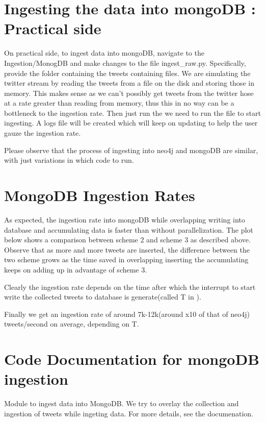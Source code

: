 \documentclass[letterpaper,10pt,english]{sphinxmanual}
\begin{document}
\section{Ingesting the data into mongoDB : Practical side}
\label{\detokenize{mongoDB_data_ingestion:ingesting-the-data-into-mongodb-practical-side}}
On practical side, to ingest data into mongoDB, navigate to the Ingestion/MonogDB and make changes to the file ingest\_raw.py. Specifically, provide the folder containing the tweets containing files. We are simulating the twitter stream by reading the tweets from a file on the disk and storing those in memory. This makes sense as we can’t possibly get tweets from the twitter hose at a rate greater than reading from memory, thus this in no way can be a bottleneck to the ingestion rate. Then just run the we need to run the file  to start ingesting. A logs file will be created which will keep on updating to help the user gauze the ingestion rate.

Please observe that the process of ingesting into neo4j and mongoDB are similar, with just variations in which code to run.


\section{MongoDB Ingestion Rates}
\label{\detokenize{mongoDB_data_ingestion:mongodb-ingestion-rates}}
As expected, the ingestion rate into mongoDB while overlapping writing into database and accumulating data is faster than without parallelization. The plot below shows a comparison between scheme 2 and scheme 3 as described above. Observe that as more and more tweets are inserted, the difference between the two scheme grows as the time saved in overlapping inserting the accumulating keeps on adding up in advantage of scheme 3.

\noindent{}

Clearly the ingestion rate depends on the time after which the interrupt to start write the collected tweets to database is generate(called T in {\hyperref[\detokenize{mongoDB_data_ingestion:improving-ingestion-rate-using-parallel-multiple-process}]{}}).

Finally we get an ingestion rate of around 7k-12k(around x10 of that of neo4j) tweets/second on average, depending on T.


\section{Code Documentation for mongoDB ingestion}
\label{\detokenize{mongoDB_data_ingestion:module-ingest_raw}}\label{\detokenize{mongoDB_data_ingestion:code-documentation-for-mongodb-ingestion}}
Module to ingest data into MongoDB. We try to overlay the collection and ingestion of tweets while ingeting data. For more details, see the documenation.
\end{document}
